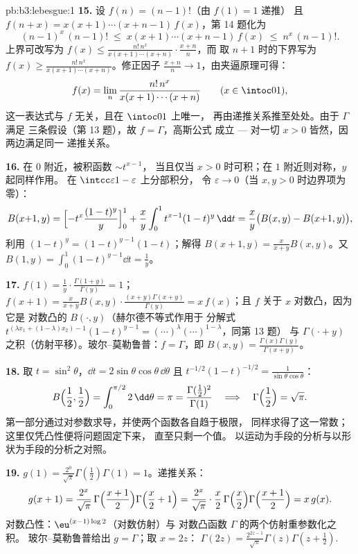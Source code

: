 \begin{solution}{pb:b3:lebesgue:1}
\textbf{15.} 设 $f(n) = (n-1)!$（由 $f(1) = 1$ 递推）
且 $f(n + x) = x(x+1)\cdots(x+n-1)\,f(x)$，第 14 题化为
\[
(n-1)^x\,(n-1)! \;\leq\; x(x+1)\cdots(x+n-1)\,f(x)
\;\leq\; n^x\,(n-1)! .
\]
上界可改写为 $f(x) \leq
\frac{n!\,n^x}{x(x+1)\cdots(x+n)}\cdot\frac{x+n}n$，而
取 $n+1$ 时的下界写为 $f(x) \geq
\frac{n!\,n^x}{x(x+1)\cdots(x+n)}$。修正因子
$\frac{x+n}n \to 1$，由夹逼原理可得：
\[
f(x) = \lim_n\frac{n!\,n^x}{x(x+1)\cdots(x+n)}
\qquad (x \in \intoc01),
\]
这一表达式与 $f$ 无关，且在 $\intoc01$ 上唯一，
再由递推关系推至处处。由于 $\Gamma$ 满足
三条假设（第 13 题），故 $f = \Gamma$，高斯公式
成立 --- 对一切 $x > 0$ 皆然，因两边满足同一
递推关系。

\textbf{16.} 在 $0$ 附近，被积函数 $\sim t^{x-1}$，
当且仅当 $x > 0$ 时可积；在 $1$ 附近则对称，$y$ 起同样作用。
在 $\intcc\varepsilon{1-\varepsilon}$ 上分部积分，
令 $\varepsilon \to 0$（当 $x, y >
0$ 时边界项为零）：
\[
B(x{+}1, y) = \Bigl[-t^x\frac{(1-t)^y}y\Bigr]_0^1 +
\frac xy\int_0^1t^{x-1}(1-t)^y\,\dd t
= \frac xy\bigl(B(x, y) - B(x{+}1, y)\bigr),
\]
利用 $(1-t)^y = (1-t)^{y-1}(1 - t)$；解得 $B(x+1, y) =
\frac{x}{x+y}B(x, y)$。又 $B(1, y) =
\int_0^1(1-t)^{y-1}\dd t = \frac1y$。

\textbf{17.} $f(1) = \frac1y\cdot\frac{\Gamma(1+y)}{\Gamma(y)}
= 1$；$f(x+1) = \frac{x}{x+y}B(x,y)\cdot\frac{(x+y)\Gamma(x+y)}
{\Gamma(y)} = x\,f(x)$；且 $f$ 关于 $x$ 对数凸，因为它是
对数凸的 $B(\cdot, y)$（赫尔德不等式作用于
分解式 $t^{(\lambda x_1 + (1-\lambda)x_2)-1}(1-t)^{y-1}
= (\cdots)^\lambda(\cdots)^{1-\lambda}$，同第 13 题）
与 $\Gamma(\cdot + y)$ 之积（仿射平移）。玻尔--莫勒鲁普：$f =
\Gamma$，即 $B(x, y) =
\frac{\Gamma(x)\Gamma(y)}{\Gamma(x+y)}$。

\textbf{18.} 取 $t = \sin^2\theta$，$\dd t =
2\sin\theta\cos\theta\,\dd\theta$ 且 $t^{-1/2}(1-t)^{-1/2} =
\frac1{\sin\theta\cos\theta}$：
\[
B\Bigl(\frac12, \frac12\Bigr) =
\int_0^{\pi/2}2\,\dd\theta = \pi
= \frac{\Gamma(\frac12)^2}{\Gamma(1)}
\quad\Longrightarrow\quad
\Gamma\Bigl(\frac12\Bigr) = \sqrt\pi .
\]
第一部分通过对参数求导，并使两个函数各自趋于极限，
同样求得了这一常数；这里仅凭凸性便将问题固定下来，
直至只剩一个值。
以运动为手段的分析与以形状为手段的分析之对照。

\textbf{19.} $g(1) = \frac{2^0}{\sqrt\pi}\Gamma(\frac12)
\Gamma(1) = 1$。递推关系：
\[
g(x+1) = \frac{2^{x}}{\sqrt\pi}\,
\Gamma\Bigl(\frac{x+1}2\Bigr)\Gamma\Bigl(\frac x2 + 1\Bigr)
= \frac{2^{x}}{\sqrt\pi}\cdot\frac x2\,
\Gamma\Bigl(\frac x2\Bigr)\Gamma\Bigl(\frac{x+1}2\Bigr)
= x\,g(x) .
\]
对数凸性：$\eu^{(x-1)\log2}$（对数仿射）与
对数凸函数 $\Gamma$ 的两个仿射重参数化之积。
玻尔--莫勒鲁普给出 $g = \Gamma$；取 $x = 2z$：
$\Gamma(2z) = \frac{2^{2z-1}}{\sqrt\pi}\Gamma(z)\Gamma(z +
\frac12)$.


\end{solution}
